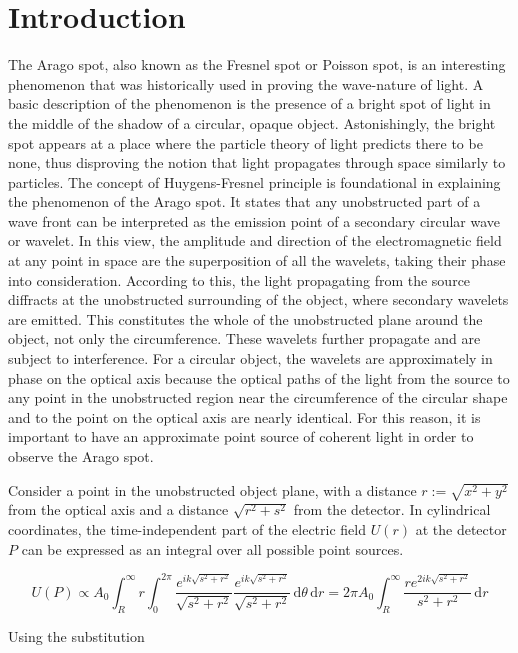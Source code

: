 \documentclass[11pt,a4paper]{article}
\begin{document}
\section{Introduction}
The Arago spot, also known as the Fresnel spot or Poisson spot, is an interesting phenomenon that was historically used in proving the wave-nature of light. A basic description of the phenomenon is the presence of a bright spot of light in the middle of the shadow of a circular, opaque object. Astonishingly, the bright spot appears at a place where the particle theory of light predicts there to be none, thus disproving the notion that light propagates through space similarly to particles. 
The concept of Huygens-Fresnel principle is foundational in explaining the phenomenon of the Arago spot. It states that any unobstructed part of a wave front can be interpreted as the emission point of a secondary circular wave or wavelet. In this view, the amplitude and direction of the electromagnetic field at any point in space are the superposition of all the wavelets, taking their phase into consideration. 
According to this, the light propagating from the source diffracts at the unobstructed surrounding of the object, where secondary wavelets are emitted. This constitutes the whole of the unobstructed plane around the object, not only the circumference. These wavelets further propagate and are subject to interference. For a circular object, the wavelets are approximately in phase on the optical axis because the optical paths of the light from the source to any point in the unobstructed region near the circumference of the circular shape and to the point on the optical axis are nearly identical. For this reason, it is important to have an approximate point source of coherent light in order to observe the Arago spot.

Consider a point in the unobstructed object plane, with a distance \(r := \sqrt{x^{2} + y^{2}}\) from the optical axis and a distance \(\sqrt{r^{2} + s^{2}}\) from the detector. In cylindrical coordinates, the time-independent part of the electric field \(U(r)\) at the detector \(P\) can be expressed as an integral over all possible point sources.

\[U(P) \propto A_{0} \int_{R}^{\infty} r \int_{0}^{2\pi} \frac{e^{ik\sqrt{s^{2} + r^{2}}}}{\sqrt{s^{2} + r^{2}}} \frac{e^{ik\sqrt{s^{2} + r^{2}}}}{\sqrt{s^{2} + r^{2}}} \, \mathrm{d}\theta \, \mathrm{d}r = 2\pi A_{0} \int_{R}^{\infty} \frac{re^{2ik\sqrt{s^{2} + r^{2}}}}{s^{2} + r^{2}} \, \mathrm{d}r\]

Using the substitution
\end{document}
